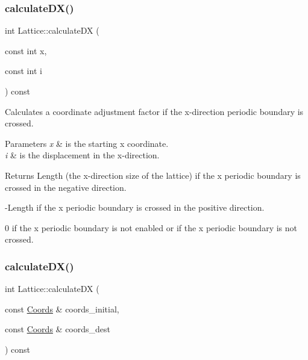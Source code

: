 \subsubsection{\texorpdfstring{calculate\+D\+X()}{calculateDX()}\hspace{0.1cm}{\footnotesize\ttfamily [1/2]}}
{\footnotesize\ttfamily int Lattice\+::calculate\+DX (\begin{DoxyParamCaption}\item[{const int}]{x,  }\item[{const int}]{i }\end{DoxyParamCaption}) const}



Calculates a coordinate adjustment factor if the x-\/direction periodic boundary is crossed. 


\begin{DoxyParams}{Parameters}
{\em x} & is the starting x coordinate. \\
\hline
{\em i} & is the displacement in the x-\/direction. \\
\hline
\end{DoxyParams}
\begin{DoxyReturn}{Returns}
Length (the x-\/direction size of the lattice) if the x periodic boundary is crossed in the negative direction. 

-\/\+Length if the x periodic boundary is crossed in the positive direction. 

0 if the x periodic boundary is not enabled or if the x periodic boundary is not crossed. 
\end{DoxyReturn}
\mbox{\label{class_lattice_ad89c5473dd37339ede9fb3d0c3db4300}} 
\subsubsection{\texorpdfstring{calculate\+D\+X()}{calculateDX()}\hspace{0.1cm}{\footnotesize\ttfamily [2/2]}}
{\footnotesize\ttfamily int Lattice\+::calculate\+DX (\begin{DoxyParamCaption}\item[{const \hyperlink{struct_coords}{Coords} \&}]{coords\+\_\+initial,  }\item[{const \hyperlink{struct_coords}{Coords} \&}]{coords\+\_\+dest }\end{DoxyParamCaption}) const}



